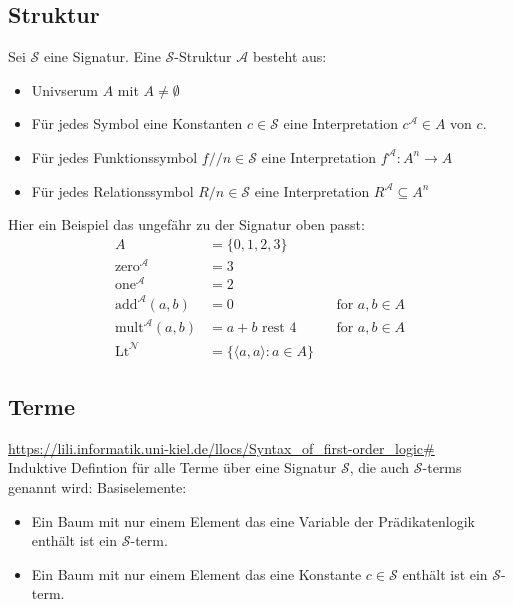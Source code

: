 \documentclass[twocolumn]{article}
\begin{document}
    \subsection{Struktur}
    Sei $\mathcal S$ eine Signatur. Eine $\mathcal S$-Struktur $\mathcal A$ besteht aus:
    \begin{itemize}
        \item Univserum $A$ mit $A \not= \emptyset$
        \item Für jedes Symbol eine Konstanten $c \in \mathcal{S}$ eine Interpretation $c^\mathcal A \in A$ von $c$.
        \item Für jedes Funktionssymbol $f/\!/n \in \mathcal S$ eine Interpretation $f^\mathcal A \colon A^n \to A$
        \item Für jedes Relationssymbol $R/n \in \mathcal S$ eine Interpretation $R^\mathcal A \subseteq A^n$
    \end{itemize}
    Hier ein Beispiel das ungefähr zu der Signatur oben passt:\\
    \begin{align*}
        A & = \{0, 1, 2, 3\} \\
        \text{zero}^\mathcal A & = 3\\
        \text{one}^\mathcal A & = 2\\
        \text{add}^\mathcal A(a,b) & = 0 && \text{for $a, b \in A$}\\
        \text{mult}^\mathcal A(a,b) & = a + b \text{ rest } 4 && \text{for $a, b \in A$}\\
        \text{Lt}^\mathcal N & = \{\langle a, a\rangle \colon a \in A\}
    \end{align*}

    \subsection{Terme}
    \url{https://lili.informatik.uni-kiel.de/llocs/Syntax_of_first-order_logic#}\\
    Induktive Defintion für alle Terme über eine Signatur $\mathcal{S}$, die auch $\mathcal{S}$-terms genannt wird:
    Basiselemente:\\
    \begin{itemize}
        \item Ein Baum mit nur einem Element das eine Variable der Prädikatenlogik enthält ist ein $\mathcal{S}$-term.
        \item Ein Baum mit nur einem Element das eine Konstante $c \in \mathcal{S}$ enthält ist ein $\mathcal{S}$-term.
    \end{itemize}
\end{document}
